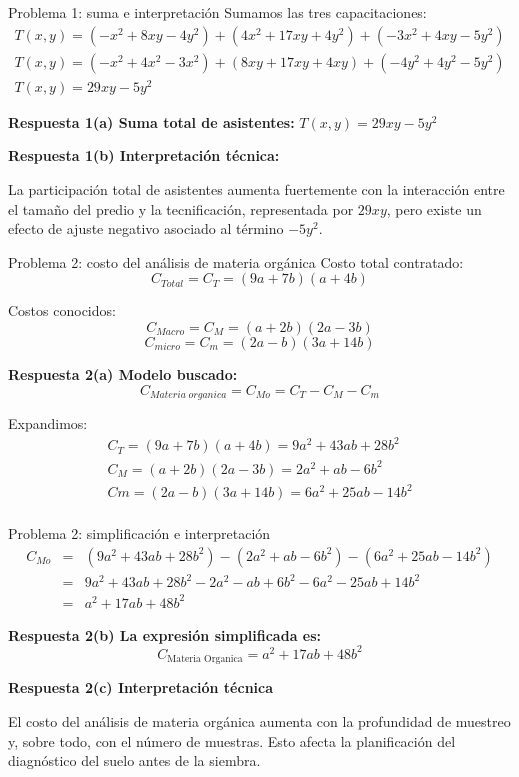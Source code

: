 \documentclass{beamer}
\begin{document}
	\begin{frame}{Problema 1: suma e interpretación}
		Sumamos las tres capacitaciones:
		\[
		\begin{array}{l}
			T(x,y)=(-x^2+8xy-4y^2)+(4x^2+17xy+4y^2)+(-3x^2+4xy-5y^2)\\
			T(x,y)=(-x^2+4x^2-3x^2)+(8xy+17xy+4xy)+(-4y^2+4y^2-5y^2)\\
			T(x,y)=29xy-5y^2
		\end{array}
		\]
		
		\textbf{Respuesta 1(a) Suma total de asistentes:} $T(x,y)=29xy-5y^2$
		
		\medskip
		
		\textbf{Respuesta 1(b) Interpretación técnica:}
		
		La participación total de asistentes aumenta fuertemente con la interacción entre el tamaño del predio y la tecnificación, representada por \(29xy\), pero existe un efecto de ajuste negativo asociado al término \(-5y^2\).
	\end{frame}
	
	\begin{frame}{Problema 2: costo del análisis de materia orgánica}
		Costo total contratado:
		\[
		C_{Total}=C_T=(9a+7b)(a+4b)
		\]
		
		Costos conocidos:
		\[
		C_{Macro}=C_M=(a+2b)(2a-3b)
		\]
		\[
		C_{micro}=C_m=(2a-b)(3a+14b)
		\]
		
		\textbf{Respuesta 2(a) Modelo buscado:}
		\[
		C_{Materia\; organica}=C_{Mo}=C_T-C_M-C_m
		\]
		
		Expandimos:
		\[
		\begin{array}{lcl}
		C_T=(9a+7b)(a+4b)=9a^2+43ab+28b^2\\
		C_M=(a+2b)(2a-3b)=2a^2+ab-6b^2\\
		Cm=(2a-b)(3a+14b)=6a^2+25ab-14b^2\\
		\end{array}
		\]
				
	\end{frame}
	
	\begin{frame}{Problema 2: simplificación e interpretación}
		\[
		\begin{array}{lcl}
			C_{Mo}&=&(9a^2+43ab+28b^2)-(2a^2+ab-6b^2)-(6a^2+25ab-14b^2)\\
     			  &=&9a^2+43ab+28b^2-2a^2-ab+6b^2-6a^2-25ab+14b^2\\
		          &=&a^2+17ab+48b^2
		\end{array}
		\]
		
		\textbf{Respuesta 2(b) La expresión simplificada es:}
		\[
		C_{\text{Materia Organica}}= a^2+17ab+48b^2
		\]
		
		
		\textbf{Respuesta 2(c) Interpretación técnica}
		
		El costo del análisis de materia orgánica aumenta con la profundidad de muestreo y, sobre todo, con el número de muestras. Esto afecta la planificación del diagnóstico del suelo antes de la siembra.
	\end{frame}
	
\end{document}
